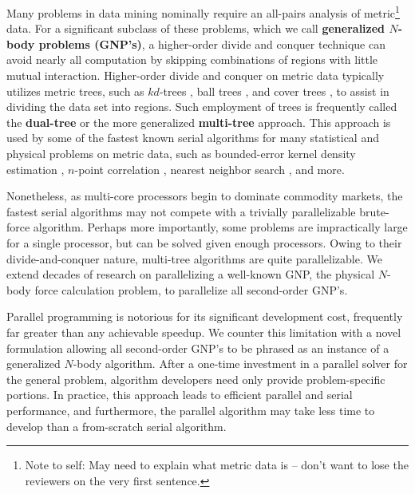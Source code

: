 \documentclass[twoside,leqno,twocolumn]{article}
\newcommand{\authornote}[1]{\footnote{Note to self: #1}}
\newcommand{\authorsnote}[1]{\authornote{#1}}
\newcommand{\defterm}[1]{{\bf #1}}
\begin{document}
Many problems in data mining nominally require an all-pairs analysis of metric\authorsnote{May need to explain what metric data is -- don't want to lose the reviewers on the very first sentence.} data.
For a significant subclass of these problems, which we call \defterm{generalized $N$-body problems (GNP's)}, a higher-order divide and conquer technique can avoid nearly all computation by skipping combinations of regions with little mutual interaction.
Higher-order divide and conquer on metric data typically utilizes metric trees, such as $kd$-trees \cite{preparata_kdtrees}, ball trees \cite{anchors_balltrees_moore}, and cover trees \cite{covertrees}, to assist in dividing the data set into regions.
Such employment of trees is frequently called the \defterm{dual-tree} or the more generalized \defterm{multi-tree} approach.
This approach is used by some of the fastest known serial algorithms for many statistical and physical problems on metric data, such as bounded-error kernel density estimation \cite{gray_kde, lee_gauss1, lee_gauss2}, $n$-point correlation \cite{gray_nbody}, nearest neighbor search \cite{gray_nbody}, and more.

Nonetheless, as multi-core processors begin to dominate commodity markets, the fastest serial algorithms may not compete with a trivially parallelizable brute-force algorithm.
Perhaps more importantly, some problems are impractically large for a single processor, but can be solved given enough processors.
Owing to their divide-and-conquer nature, multi-tree algorithms are quite parallelizable.
We extend decades of research on parallelizing a well-known GNP, the physical $N$-body force calculation problem, to parallelize all second-order GNP's.

Parallel programming is notorious for its significant development cost, frequently far greater than any achievable speedup.
We counter this limitation with a novel formulation allowing all second-order GNP's to be phrased as an instance of a generalized $N$-body algorithm.
After a one-time investment in a parallel solver for the general problem, algorithm developers need only provide problem-specific portions.
In practice, this approach leads to efficient parallel and serial performance, and furthermore, the parallel algorithm may take less time to develop than a from-scratch serial algorithm.

\end{document}
